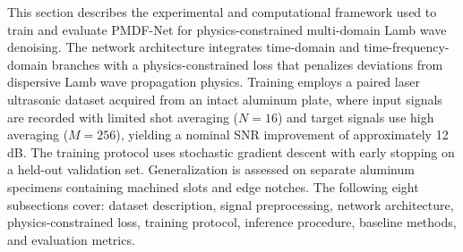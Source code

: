 This section describes the experimental and computational framework used to train and evaluate PMDF-Net for physics-constrained multi-domain Lamb wave denoising. The network architecture integrates time-domain and time-frequency-domain branches with a physics-constrained loss that penalizes deviations from dispersive Lamb wave propagation physics. Training employs a paired laser ultrasonic dataset acquired from an intact aluminum plate, where input signals are recorded with limited shot averaging ($N = 16$) and target signals use high averaging ($M = 256$), yielding a nominal SNR improvement of approximately 12 dB. The training protocol uses stochastic gradient descent with early stopping on a held-out validation set. Generalization is assessed on separate aluminum specimens containing machined slots and edge notches. The following eight subsections cover: dataset description, signal preprocessing, network architecture, physics-constrained loss, training protocol, inference procedure, baseline methods, and evaluation metrics.
